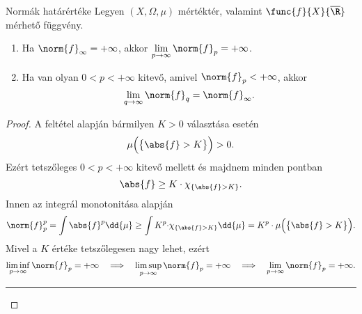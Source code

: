 \documentclass[
]{elteikthesis}[2024/04/26]
\begin{document}
	\newpage
	\begin{theorem}{Normák határértéke}{}
		Legyen \( (X, \Omega, \mu) \) mértéktér, 
		valamint \( \func{f}{X}{\overline{\R}} \) mérhető függvény.
		\begin{enumerate}
			\item\label{eq:lp-norma-határérték-01}
			Ha \( \norm{f}_\infty = +\infty \),
			akkor \( \lim\limits_{p \to \infty} \norm{f}_p = +\infty \).
			
			\item\label{eq:lp-norma-határérték-02}
			Ha van olyan \( 0 < p < +\infty \) kitevő, amivel \( \norm{f}_p < +\infty \), akkor
			\[
				\lim\limits_{q \to \infty} \norm{f}_q = \norm{f}_\infty.
			\]
		\end{enumerate}
	\end{theorem}
	\begin{proof}
		A feltétel alapján bármilyen \( K > 0 \) választása esetén
		\[
			\mu \Bigl( \bigl\{ \abs{f} > K \bigr\} \Bigr) > 0.
		\]
		Ezért tetszőleges \( 0 < p < +\infty \) kitevő mellett és majdnem minden pontban
		\[
			\abs{f} \geq 
			K \cdot \chi_{\{ \abs{f} > K \}}.
		\]
		Innen az integrál monotonitása alapján
		\[
			\norm{f}_p^p = 
			\int \abs{f}^p \dd{\mu} \geq
			\int K^p {\cdot} \chi_{\{ \abs{f} > K \}} \dd{\mu} =
			K^p \cdot \mu \Bigl( \bigl\{ \abs{f} > K \bigr\} \Bigr).
		\]
		Mivel a \( K \) értéke tetszőlegesen nagy lehet, ezért
		\[
			\liminf_{p \to \infty} \norm{f}_p = +\infty
			\quad \Longrightarrow \quad
			\limsup_{p \to \infty} \norm{f}_p = +\infty
			\quad \Longrightarrow \quad
			\lim_{p \to \infty} \norm{f}_p = +\infty.
		\]
		
		\vspace{3pt}
		\hrule
		\vspace{9pt}
		

\end{proof}
\end{document}
